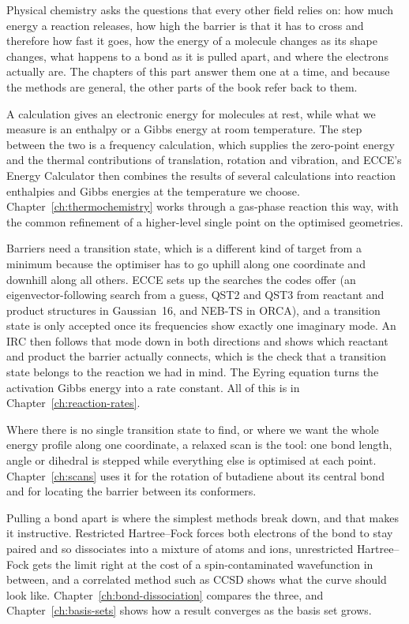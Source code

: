 
Physical chemistry asks the questions that every other field relies on: how much energy a reaction releases, how high the barrier is that it has to cross and therefore how fast it goes, how the energy of a molecule changes as its shape changes, what happens to a bond as it is pulled apart, and where the electrons actually are. The chapters of this part answer them one at a time, and because the methods are general, the other parts of the book refer back to them.

A calculation gives an electronic energy for molecules at rest, while what we measure is an enthalpy or a Gibbs energy at room temperature. The step between the two is a frequency calculation, which supplies the zero-point energy and the thermal contributions of translation, rotation and vibration, and ECCE's Energy Calculator then combines the results of several calculations into reaction enthalpies and Gibbs energies at the temperature we choose. Chapter~\ref{ch:thermochemistry} works through a gas-phase reaction this way, with the common refinement of a higher-level single point on the optimised geometries.

Barriers need a transition state, which is a different kind of target from a minimum because the optimiser has to go uphill along one coordinate and downhill along all others. ECCE sets up the searches the codes offer (an eigenvector-following search from a guess, QST2 and QST3 from reactant and product structures in Gaussian~16, and NEB-TS in ORCA), and a transition state is only accepted once its frequencies show exactly one imaginary mode. An IRC then follows that mode down in both directions and shows which reactant and product the barrier actually connects, which is the check that a transition state belongs to the reaction we had in mind. The Eyring equation turns the activation Gibbs energy into a rate constant. All of this is in Chapter~\ref{ch:reaction-rates}.

Where there is no single transition state to find, or where we want the whole energy profile along one coordinate, a relaxed scan is the tool: one bond length, angle or dihedral is stepped while everything else is optimised at each point. Chapter~\ref{ch:scans} uses it for the rotation of butadiene about its central bond and for locating the barrier between its conformers.

Pulling a bond apart is where the simplest methods break down, and that makes it instructive. Restricted Hartree--Fock forces both electrons of the bond to stay paired and so dissociates  into a mixture of atoms and ions, unrestricted Hartree--Fock gets the limit right at the cost of a spin-contaminated wavefunction in between, and a correlated method such as CCSD shows what the curve should look like. Chapter~\ref{ch:bond-dissociation} compares the three, and Chapter~\ref{ch:basis-sets} shows how a result converges as the basis set grows.

